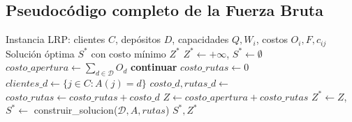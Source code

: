 \documentclass[12pt,a4paper]{article}
\begin{document}
\subsection{Pseudocódigo completo de la Fuerza Bruta}

\begin{algorithm}[H]
\caption{Fuerza Bruta Exacta para LRP}
\label{alg:fb}
\begin{algorithmic}[1]
\Require Instancia LRP: clientes $C$, depósitos $D$, capacidades $Q, W_i$, costos $O_i, F, c_{ij}$
\Ensure Solución óptima $S^*$ con costo mínimo $Z^*$
\State $Z^* \gets +\infty$, $S^* \gets \emptyset$
   
    \State $costo\_apertura \gets \sum_{d \in \mathcal{D}} O_d$
                     
          
            \State \textbf{continuar}                                      
        \EndIf
        \State $costo\_rutas \gets 0$
            \State $clientes\_d \gets \{j \in C : A(j) = d\}$
            \State $costo\_d, rutas\_d \gets$ 
            \State $costo\_rutas \gets costo\_rutas + costo\_d$
        \EndFor
        \State $Z \gets costo\_apertura + costo\_rutas$
            \State $Z^* \gets Z$, $S^* \gets$ construir\_solucion($\mathcal{D}, A, rutas$)
        \EndIf
    \EndFor
\EndFor
\State \Return $S^*, Z^*$
\end{algorithmic}
\end{algorithm}
\end{document}
